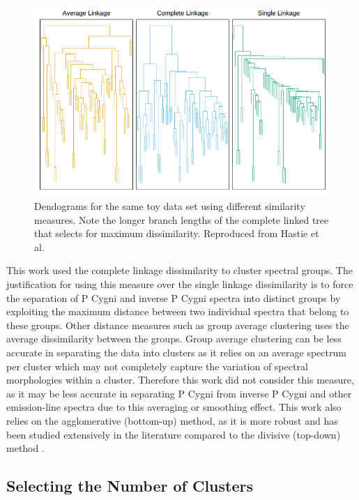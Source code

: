 \begin{figure}[!htb]
\centering
\includegraphics[scale=0.60]{figures/complete linkage.png}
\caption{Dendograms for the same toy data set using different similarity measures. Note the longer branch lengths of the complete linked tree that selects for maximum dissimilarity. Reproduced from Hastie et al. \citep{hastie2009elements}}
\end{figure}

This work used the complete linkage dissimilarity to cluster spectral groups. The justification for using this measure over the single linkage dissimilarity is to force the separation of P Cygni and inverse P Cygni spectra into distinct groups by exploiting the maximum distance between two individual spectra that belong to these groups. Other distance measures such as group average clustering uses the average dissimilarity between the groups. Group average clustering can be less accurate in separating the data into clusters as it relies on an average spectrum per cluster which may not completely capture the variation of spectral morphologies within a cluster. Therefore this work did not consider this measure, as it may be less accurate in separating P Cygni from inverse P Cygni and other emission-line spectra due to this averaging or smoothing effect. This work also relies on the agglomerative (bottom-up) method, as it is more robust and has been studied extensively in the literature compared to the divisive (top-down) method \citep{hastie2009elements}.

\subsection{Selecting the Number of Clusters}

